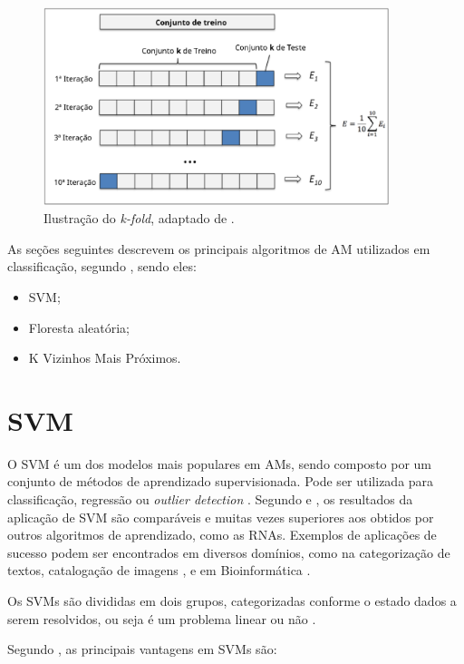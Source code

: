 \begin{figure}[!htb]
    \centering
     \includegraphics[width=0.9\textwidth]{figuras/kfold.eps}
     \caption{Ilustração do \textit{k-fold}, adaptado de .}
     \label{kfold}
\end{figure}

As seções seguintes descrevem os principais algoritmos de AM utilizados em classificação, segundo , sendo eles:
\begin{itemize}
    \item SVM;
    \item Floresta aleatória;
    \item K Vizinhos Mais Próximos.
\end{itemize}

\section{SVM}

O SVM é um dos modelos mais populares em AMs, sendo composto por um conjunto de métodos de aprendizado supervisionada. Pode ser utilizada para classificação, regressão ou \textit{outlier detection} \cite{scikitlearn}. Segundo  e , os resultados da aplicação de SVM são comparáveis e muitas vezes superiores aos obtidos por outros algoritmos de aprendizado, como as RNAs. Exemplos de aplicações de sucesso podem ser encontrados em diversos domínios, como na categorização de textos,  catalogação de imagens \cite{pontil1998support}, e em Bioinformática \cite{noble2004support}.

Os SVMs são divididas em dois grupos, categorizadas conforme o estado dados a serem resolvidos, ou seja é um problema linear ou não \cite{lorena2007introduccao}.

Segundo , as principais vantagens em SVMs são:

